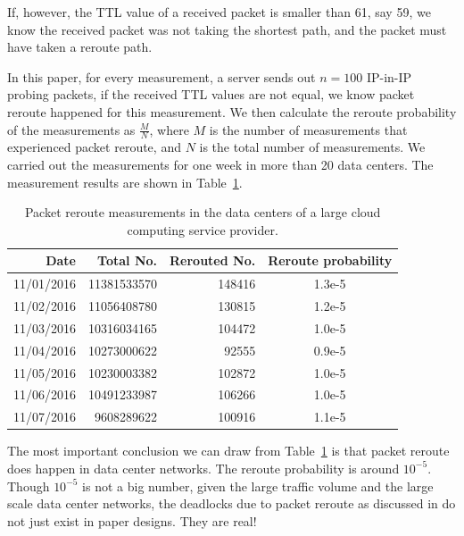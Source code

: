 {If, however, the TTL value of a received packet is smaller than 61, say 59, we know the received packet was not taking the shortest path, and the packet must have taken a reroute path.

In this paper, for every measurement, a server sends out $n=100$ IP-in-IP probing packets, if the received TTL values are not equal, we know packet reroute happened for this measurement. We then calculate the reroute probability of the measurements as $\frac{M}{N}$, where $M$ is the number of measurements that experienced packet reroute, and $N$ is the total number of measurements. We carried out the measurements for one week in more than 20 data centers. The measurement results are shown in Table~\ref{fig:reroute}.

\begin{table}[t]
\begin{small}
\begin{center}
\begin{tabular}{|r|r|r|c|}
\hline    Date    & Total No.  & Rerouted No.   & Reroute probability \\
\hline 11/01/2016 & 11381533570 & 148416 &  1.3e-5 \\
\hline 11/02/2016 & 11056408780 & 130815 &  1.2e-5 \\
\hline 11/03/2016 & 10316034165 & 104472 &  1.0e-5 \\
\hline 11/04/2016 & 10273000622 & 92555  &  0.9e-5 \\
\hline 11/05/2016 & 10230003382 & 102872 &  1.0e-5 \\
\hline 11/06/2016 & 10491233987 & 106266 &  1.0e-5 \\
\hline 11/07/2016 & 9608289622  & 100916 &  1.1e-5 \\
\hline
\end{tabular}
\end{center}
\caption{Packet reroute measurements in the data centers of a large cloud computing service provider.}\label{fig:reroute}
\end{small}
\end{table}

The most important conclusion we can draw from Table~\ref{fig:reroute} is that packet reroute does happen in data center networks. The reroute probability is around $10^{-5}$. Though $10^{-5}$ is not a big number, given the large traffic volume and the large scale data center networks, the deadlocks due to packet reroute as discussed in \cite{rdmaatscale,shpiner2016unlocking,hu2016deadlocks} do not just exist in paper designs. They are real!

}
